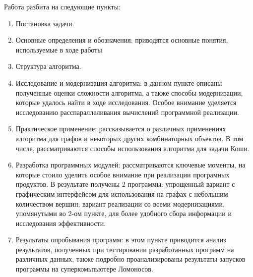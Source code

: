 Работа разбита на следующие пункты:
\begin{enumerate}
\item Постановка задачи.
\item Основные определения и обозначения: приводятся основные понятия, используемые в ходе работы.
\item Структура алгоритма.
\item Исследование и модернизация алгоритма: в данном пункте описаны полученные оценки сложности алгоритма, а также способы модернизации, которые удалось найти в ходе исследования. Особое внимание уделяется исследованию расспараллеливания вычислений программной реализации.
\item Практическое применение: рассказывается о различных применениях алгоритма для графов и некоторых других комбинаторных объектов. В том числе, рассматриваются способы использования алгоритма для задачи Коши.
\item Разработка программных модулей: рассматриваются ключевые моменты, на которые стоило уделить особое внимание при реализации програмных продуктов. В результате получены 2 программы: упрощенный вариант с графическим интерфейсом для использования на графах с небольшим количеством вершин; вариант реализации со всеми модернизациями, упомянутыми во 2-ом пункте, для более удобного сбора информации и исследования эффективности.
\item Результаты опробывания программ: в этом пункте приводится анализ результатов, полученных при тестировании разработанных программ на различных данных, также подробно проанализированы результаты запусков программы на суперкомьпьютере Ломоносов.
\end{enumerate}